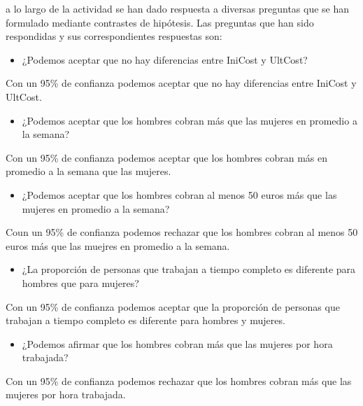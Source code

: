 \documentclass[
  a4paper]{article}
\providecommand{\tightlist}{%
  \setlength{\itemsep}{0pt}\setlength{\parskip}{0pt}}
\begin{document}
a lo largo de la actividad se han dado respuesta a diversas preguntas
que se han formulado mediante contrastes de hipótesis. Las preguntas que
han sido respondidas y sus correspondientes respuestas son:

\begin{itemize}
\tightlist
\item
  ¿Podemos aceptar que no hay diferencias entre IniCost y UltCost?
\end{itemize}

Con un 95\% de confianza podemos aceptar que no hay diferencias entre
IniCost y UltCost.

\begin{itemize}
\tightlist
\item
  ¿Podemos aceptar que los hombres cobran más que las mujeres en
  promedio a la semana?
\end{itemize}

Con un 95\% de confianza podemos aceptar que los hombres cobran más en
promedio a la semana que las mujeres.

\begin{itemize}
\tightlist
\item
  ¿Podemos aceptar que los hombres cobran al menos 50 euros más que las
  mujeres en promedio a la semana?
\end{itemize}

Coun un 95\% de confianza podemos rechazar que los hombres cobran al
menos 50 euros más que las muejres en promedio a la semana.

\begin{itemize}
\tightlist
\item
  ¿La proporción de personas que trabajan a tiempo completo es diferente
  para hombres que para mujeres?
\end{itemize}

Con un 95\% de confianza podemos aceptar que la proporción de personas
que trabajan a tiempo completo es diferente para hombres y mujeres.

\begin{itemize}
\tightlist
\item
  ¿Podemos afirmar que los hombres cobran más que las mujeres por hora
  trabajada?
\end{itemize}

Con un 95\% de confianza podemos rechazar que los hombres cobran más que
las mujeres por hora trabajada.
\end{document}
